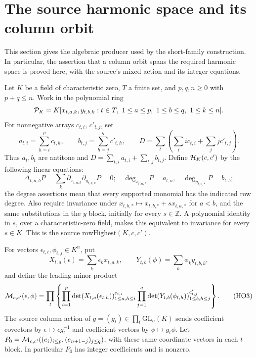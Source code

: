 \section{The source harmonic space and its column orbit}
\label{sec:sr-source-harmonic-orbit}

This section gives the algebraic producer used by the short-family
construction.  In particular, the assertion that a column orbit spans
the required harmonic space is proved here, with the source's mixed
action and its integer equations.

Let \(K\) be a field of characteristic zero, \(T\) a finite set, and
\(p,q,n\ge0\) with \(p+q\le n\).  Work in the polynomial ring
\[
 {\cal P}_K=K[x_{t,a,k},y_{t,b,k}:
     t\in T,\ 1\le a\le p,\ 1\le b\le q,\ 1\le k\le n].
\]
For nonnegative arrays \(c_{t,i}\), \(c'_{t,j}\), set
\[
 a_{t,i}=\sum_{h=i}^{p}c_{t,h},\qquad
 b_{t,j}=\sum_{h=j}^{q}c'_{t,h},\qquad
 D=\sum_t\left(\sum_i i c_{t,i}+\sum_j j c'_{t,j}\right).
 \tag{HO1}\label{eq:sr-source-harmonic-degree}
\]
Thus \(a_t,b_t\) are antitone and \(D=\sum_{t,i}a_{t,i}
+\sum_{t,j}b_{t,j}\).  Define \({\cal H}_K(c,c')\) by the following
linear equations:
\[
 \Delta_{t,a,b}P=\sum_k
           \partial_{x_{t,a,k}}\partial_{y_{t,b,k}}P=0;
 \quad
 \deg_{x_{t,a,*}}P=a_{t,a},\quad
 \deg_{y_{t,b,*}}P=b_{t,b};
 \tag{HO2}\label{eq:sr-source-row-highest}
\]
the degree assertions mean that every supported monomial has the
indicated row degree.  Also require invariance under
\(x_{t,b,*}\mapsto x_{t,b,*}+s x_{t,a,*}\) for \(a<b\), and the
same substitutions in the \(y\) block, initially for every
\(s\in\mathbb Z\).  A polynomial identity in \(s\), over a
characteristic-zero field, makes this equivalent to invariance for
every \(s\in K\).  This is the source
\(\mathrm{rowHighest}(K,c,c')\).

For vectors \(\epsilon_{t,i},\phi_{t,j}\in K^n\), put
\[
 X_{t,a}(\epsilon)=\sum_k\epsilon_kx_{t,a,k},\qquad
 Y_{t,b}(\phi)=\sum_k\phi_ky_{t,b,k},
\]
and define the leading-minor product
\[
 {\cal M}_{c,c'}(\epsilon,\phi)=
 \prod_t\left\{
   \prod_{i=1}^{p}
       \det(X_{t,a}(\epsilon_{t,h}))_{1\le a,h\le i}^{c_{t,i}}
   \prod_{j=1}^{q}
       \det(Y_{t,b}(\phi_{t,h}))_{1\le b,h\le j}^{c'_{t,j}}
          \right\}.
 \tag{HO3}\label{eq:sr-source-minor-product}
\]
The source column action of \(g=(g_t)\in\prod_t\mathrm{GL}_n(K)\)
sends coefficient covectors by \(\epsilon\mapsto\epsilon g_t^{-1}\)
and coefficient vectors by \(\phi\mapsto g_t\phi\).
Let \(P_0={\cal M}_{c,c'}((e_i)_{i\le p},
(e_{n+1-j})_{j\le q})\), with these same coordinate vectors in
each \(t\) block.  In particular \(P_0\) has integer coefficients
and is nonzero.

